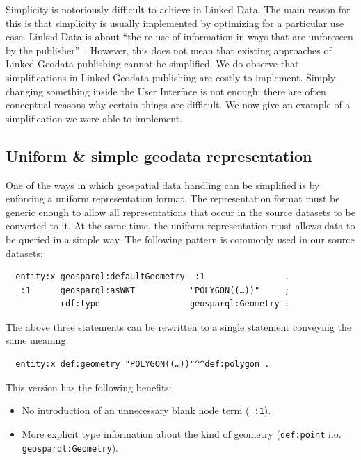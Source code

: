 \documentclass[a4paper]{scrartcl}
\newcommand{\textt}[1]{{\small \texttt{#1}}}
\begin{document}
Simplicity is notoriously difficult to achieve in Linked Data.  The
main reason for this is that simplicity is usually implemented by
optimizing for a particular use case.  Linked Data is about ``the
re-use of information in ways that are unforeseen by the
publisher''~\cite{Bernerslee2006}.  However, this does not mean that
existing approaches of Linked Geodata publishing cannot be simplified.
We do observe that simplifications in Linked Geodata publishing are
costly to implement.  Simply changing something inside the User
Interface is not enough: there are often conceptual reasons why
certain things are difficult.  We now give an example of a
simplification we were able to implement.


\subsection{Uniform \& simple geodata representation}

One of the ways in which geospatial data handling can be simplified is
by enforcing a uniform representation format.  The representation
format must be generic enough to allow all representations that occur
in the source datasets to be converted to it.  At the same time, the
uniform representation must allows data to be queried in a simple way.
The following pattern is commonly used in our source datasets:

\begin{verbatim}
  entity:x geosparql:defaultGeometry _:1                .
  _:1      geosparql:asWKT           "POLYGON((…))"     ;
           rdf:type                  geosparql:Geometry .
\end{verbatim}

The above three statements can be rewritten to a single statement
conveying the same meaning:

\begin{verbatim}
  entity:x def:geometry "POLYGON((…))"^^def:polygon .
\end{verbatim}

This version has the following benefits:

\begin{itemize}

\item No introduction of an unnecessary blank node term (\textt{\_:1}).

\item More explicit type information about the kind of geometry
  (\textt{def:point} i.o. \textt{geosparql:Geometry}).

\end{itemize}
\end{document}
